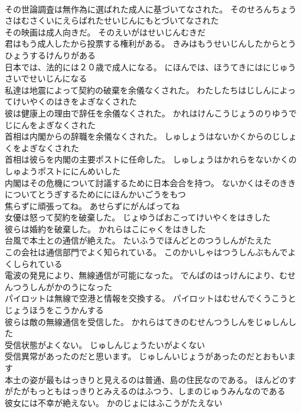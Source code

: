 \documentclass[8pt]{extreport}
\begin{document}
\begin{CJK}{UTF8}{min}
\\	その世論調査は無作為に選ばれた成人に基づいてなされた。	そのせろんちょうさはむさくいにえらばれたせいじんにもとづいてなされた 
\\	その映画は成人向きだ。	そのえいがはせいじんむきだ 
\\	君はもう成人したから投票する権利がある。	きみはもうせいじんしたからとうひょうするけんりがある 
\\	日本では、法的には２０歳で成人になる。	にほんでは、ほうてきにはにじゅうさいでせいじんになる 
\\	私達は地震によって契約の破棄を余儀なくされた。	わたしたちはじしんによってけいやくのはきをよぎなくされた 
\\	彼は健康上の理由で辞任を余儀なくされた。	かれはけんこうじょうのりゆうでじにんをよぎなくされた 
\\	首相は内閣からの辞職を余儀なくされた。	しゅしょうはないかくからのじしょくをよぎなくされた 
\\	首相は彼らを内閣の主要ポストに任命した。	しゅしょうはかれらをないかくのしゅようポストににんめいした 
\\	内閣はその危機について討議するために日本会合を持つ。	ないかくはそのききについてとうぎするためににほんかいごうをもつ 
\\	焦らずに頑張ってね。	あせらずにがんばってね 
\\	女優は怒って契約を破棄した。	じょゆうばおこってけいやくをはきした 
\\	彼らは婚約を破棄した。	かれらはこにゃくをはきした 
\\	台風で本土との通信が絶えた。	たいふうでほんどとのつうしんがたえた 
\\	この会社は通信部門でよく知られている。	このかいしゃはつうしんぶもんでよくしられている 
\\	電波の発見により、無線通信が可能になった。	でんぱのはっけんにより、むせんつうしんがかのうになった 
\\	パイロットは無線で空港と情報を交換する。	パイロットはむせんでくうこうとじょうほうをこうかんする 
\\	彼らは敵の無線通信を受信した。	かれらはてきのむせんつうしんをじゅしんした 
\\	受信状態がよくない。	じゅしんじょうたいがよくない 
\\	受信異常があったのだと思います。	じゅしんいじょうがあったのだとおもいます 
\\	本土の姿が最もはっきりと見えるのは普通、島の住民なのである。	ほんどのすがたがもっともはっきりとみえるのはふつう、しまのじゅうみんなのである 
\\	彼女には不幸が絶えない。	かのじょにはふこうがたえない 

\end{CJK}
\end{document}
